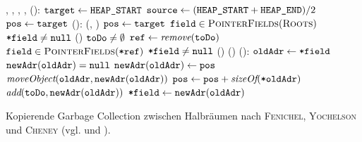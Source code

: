 \begin{algorithm}[h]
\begin{algorithmic}[1]
	\Global {}, , , , 
	\State {}():
	\State \quad $\texttt{target} \gets \texttt{HEAP\_START}$		
	\State \quad $\texttt{source} \gets (\texttt{HEAP\_START} + \texttt{HEAP\_END}) / 2$		
	\State \quad $\texttt{pos} \gets \texttt{target}$		
	\Statex
	\State \Atomic {}():
	\State \quad {}(, )		
	\State \quad $\texttt{pos} \gets \texttt{target}$
	\State \quad \FOREACH $\texttt{field} \in \textsc{PointerFields}(\textsc{Roots})$		
	\State \quad \quad \IF $\texttt{*field} \neq \texttt{null}$
	\State \quad \quad \quad {}()		
	\State \quad \WHILE $\texttt{toDo} \neq \emptyset$		
	\State \quad \quad $\texttt{ref} \gets \textit{remove}(\texttt{toDo})$	
	\State \quad \quad \FOREACH $\texttt{field} \in \textsc{PointerFields}(\texttt{*ref})$
	\State \quad \quad \quad \IF $\texttt{*field} \neq \texttt{null}$
	\State \quad \quad \quad \quad {}()	
	\State \quad {}()
	\Statex
	\State {}():
	\State \quad $\texttt{oldAdr} \gets \texttt{*field}$		
	\State \quad \IF $\texttt{newAdr}(\texttt{oldAdr}) = \texttt{null}$	
	\State \quad \quad $\texttt{newAdr}(\texttt{oldAdr}) \gets \texttt{pos}$		
	\State \quad \quad $\textit{moveObject}(\texttt{oldAdr}, \texttt{newAdr}(\texttt{oldAdr}))$
	\State \quad \quad $\texttt{pos} \gets \texttt{pos} + \textit{sizeOf}(\texttt{*oldAdr})$	
	\State \quad \quad $\textit{add}(\texttt{toDo}, \texttt{newAdr}(\texttt{oldAdr}))$	
	\State \quad $\texttt{*field} \gets \texttt{newAdr}(\texttt{oldAdr})$	
\end{algorithmic}
\caption[Kopierende Garbage Collection nach \textsc{Fenichel}, \textsc{Yochelson} und \textsc{Cheney}]{Kopierende Garbage Collection zwischen Halbräumen nach \textsc{Fenichel}, \textsc{Yochelson} und \textsc{Cheney} (vgl. \cite{fenichel1969} und \cite{cheney1970}).}
\label{algo:copying-gc}
\end{algorithm}

